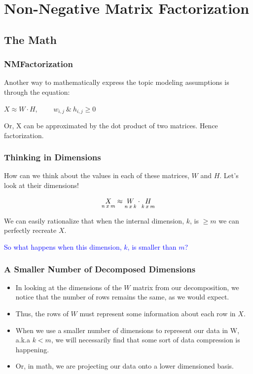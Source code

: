 \documentclass{beamer}
\begin{document}
\section{Non-Negative Matrix Factorization}
\subsection{The Math}
\begin{frame}
  \frametitle{NMFactorization}
  Another way to mathematically express the topic modeling assumptions is through the equation: \vspace{6mm}

  \begin{center}
    {\LARGE $ X \approx W \cdot H $},  $ \qquad w_{i, j}\: \& \: h_{i, j} \geq 0 $ \vspace{4mm}
  \end{center}

  Or, X can be approximated by the dot product of two matrices. Hence factorization.
\end{frame}

\begin{frame}
  \frametitle{Thinking in Dimensions}
  How can we think about the values in each of these matrices, $W$ and $H$. Let's look at their dimensions!

  {\LARGE $$ \underset{\small n\: x \: m}{X} \approx \underset{\small n\: x \: k}{W} \cdot \underset{\small k\: x \: m}{H} $$} \vspace{4mm}

  We can easily rationalize that when the internal dimension, $k$, is $\geq m$ we can perfectly recreate $X$. \vspace{6mm} \pause

  \centering
  \textcolor{blue}{So what happens when this dimension, $k$, is smaller than $m$?}
\end{frame}

\begin{frame}
  \frametitle{A Smaller Number of Decomposed Dimensions}
  \begin{itemize}
    \item In looking at the dimensions of the $W$ matrix from our decomposition, we notice that the number of rows remains the same, as we would expect. \vspace{4mm}

    \item Thus, the rows of $W$ must represent some information about each row in $X$. \vspace{4mm}

    \item When we use a smaller number of dimensions to represent our data in W, a.k.a $k < m$, we will necessarily find that some sort of data compression is happening. \vspace{4mm}

    \item Or, in math, we are projecting our data onto a lower dimensioned basis.
  \end{itemize}
\end{frame}
\end{document}
